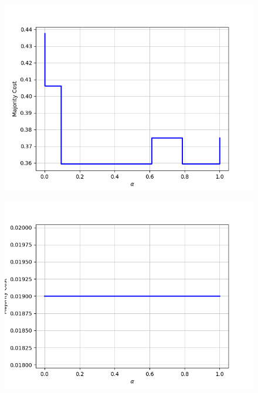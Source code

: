 \begin{figure}[h]\ContinuedFloat
\centering
\begin{minipage}{.24\textwidth}
  \centering
  {\includegraphics[width=\linewidth]{plots/nell-ac/personnorthamerica}}
\end{minipage}
\begin{minipage}{.24\textwidth}
  \centering
  {\includegraphics[width=\linewidth]{plots/nell-ac/physiologicalcondition}}
\end{minipage}
\begin{minipage}{.24\textwidth}
  \centering

\end{minipage}
\end{figure}
